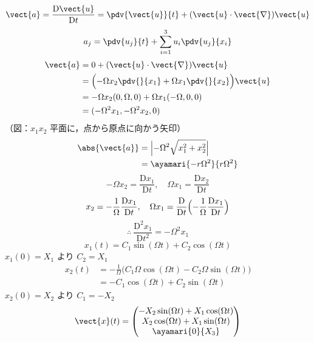 \[ \vect{a}=\frac{\mathrm{D}\vect{u}}{\mathrm{D}t}=\pdv{\vect{u}}{t}+(\vect{u}\cdot\vect{\nabla})\vect{u} \]
\[ a_{j}=\pdv{u_{j}}{t}+\sum_{i=1}^{3}u_{i}\pdv{u_{j}}{x_{i}} \]
\begin{align*}
\vect{a}&=0+(\vect{u}\cdot\vect{\nabla})\vect{u}\\
&=\Bigl(-\Omega x_{2}\pdv{}{x_{1}}+\Omega x_{1}\pdv{}{x_{2}}\Bigr)\vect{u}\\
&=-\Omega x_{2}(0,\Omega,0)+\Omega x_{1}(-\Omega,0,0)\\
&=(-\Omega^{2}x_{1},-\Omega^{2}x_{2},0)
\end{align*}
（図：$x_{1}x_{2}$ 平面に，点から原点に向かう矢印）
\begin{align*}
\abs{\vect{a}}&=\Bigl|-\Omega^{2}\sqrt{x_{1}^{2}+x_{2}^{2}}\Bigr|\\
&=\ayamari{-r\Omega^{2}}{r\Omega^{2}}
\end{align*}
\[ -\Omega x_{2}=\frac{\mathrm{D}x_{1}}{\mathrm{D}t},\quad \Omega x_{1}=\frac{\mathrm{D}x_{2}}{\mathrm{D}t} \]
\[ x_{2}=-\frac{1}{\Omega}\frac{\mathrm{D}x_{1}}{\mathrm{D}t},\quad \Omega x_{1}=\frac{\mathrm{D}}{\mathrm{D}t}\Bigl(-\frac{1}{\Omega}\frac{\mathrm{D}x_{1}}{\mathrm{D}t}\Bigr) \]
\[ \therefore\ \frac{\mathrm{D}^{2}x_{1}}{\mathrm{D}t^{2}}=-\Omega^{2}x_{1} \]
\[ x_{1}(t)=C_{1}\sin(\Omega t)+C_{2}\cos(\Omega t) \]
$x_{1}(0)=X_{1}$ より $C_{2}=X_{1}$
\begin{align*}
x_{2}(t)&=-\frac{1}{\Omega}\bigl(C_{1}\Omega\cos(\Omega t)-C_{2}\Omega\sin(\Omega t)\bigr)\\
&=-C_{1}\cos(\Omega t)+C_{2}\sin(\Omega t)
\end{align*}
$x_{2}(0)=X_{2}$ より $C_{1}=-X_{2}$
\[ \vect{x}(t)=\begin{pmatrix}-X_{2}\sin(\Omega t)+X_{1}\cos(\Omega t)\\X_{2}\cos(\Omega t)+X_{1}\sin(\Omega t)\\\ayamari{0}{X_{3}}\end{pmatrix} \]
